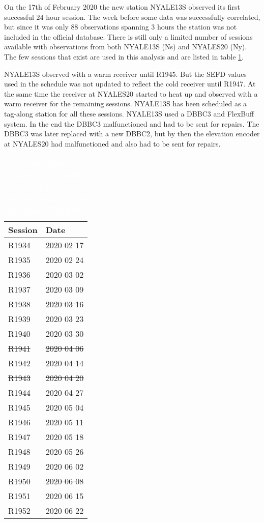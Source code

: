 On the 17th of February 2020 the new station NYALE13S observed its first
successful 24 hour session. The week before some data was successfully correlated,
but since it was only 88 observations spanning 3 hours the station was not included 
in the official database. There is still only a limited number of sessions available 
with observations from both NYALE13S (Ns) and NYALES20 (Ny). The few sessions that 
exist are used in this analysis and are listed in table \ref{tab:sessions}.

NYALE13S observed with a warm receiver until R1945. But the SEFD values used in the schedule was not
updated to reflect the cold receiver until R1947. At the same time the receiver
at NYALES20 started to heat up and observed with a warm receiver for the
remaining sessions. NYALE13S has been scheduled as a tag-along
station for all these sessions. NYALE13S used a DBBC3 and FlexBuff system. In
the end the DBBC3 malfunctioned and had to be sent for repairs. The DBBC3 was
later replaced with a new DBBC2, but by then the elevation encoder at NYALES20
had malfunctioned and also had to be sent for repairs.

\begin{table}
	\begin{tabularx}{\columnwidth}{X|X}
	Session & Date \\
	\hline
	R1934 & 2020 02 17 \\
	R1935 & 2020 02 24 \\
	R1936 & 2020 03 02 \\
	R1937 & 2020 03 09 \\
	\sout{R1938} & \sout{2020 03 16} \\
	R1939 & 2020 03 23 \\
	R1940 & 2020 03 30 \\
	\sout{R1941} & \sout{2020 04 06} \\
	\sout{R1942} & \sout{2020 04 14} \\
	\sout{R1943} & \sout{2020 04 20} \\
	R1944 & 2020 04 27 \\
	R1945 & 2020 05 04 \\
	R1946 & 2020 05 11 \\
	R1947 & 2020 05 18 \\
	R1948 & 2020 05 26 \\
	R1949 & 2020 06 02 \\
	\sout{R1950} & \sout{2020 06 08} \\
	R1951 & 2020 06 15 \\
	R1952 & 2020 06 22 \\
	\hline
	\end{tabularx}
\caption{\textcolor{white}{Sessions used in analysis. The struck through rows are sessions with no useful
 data from NYALE13S.}}
\label{tab:sessions}
\end{table}

\endinput
